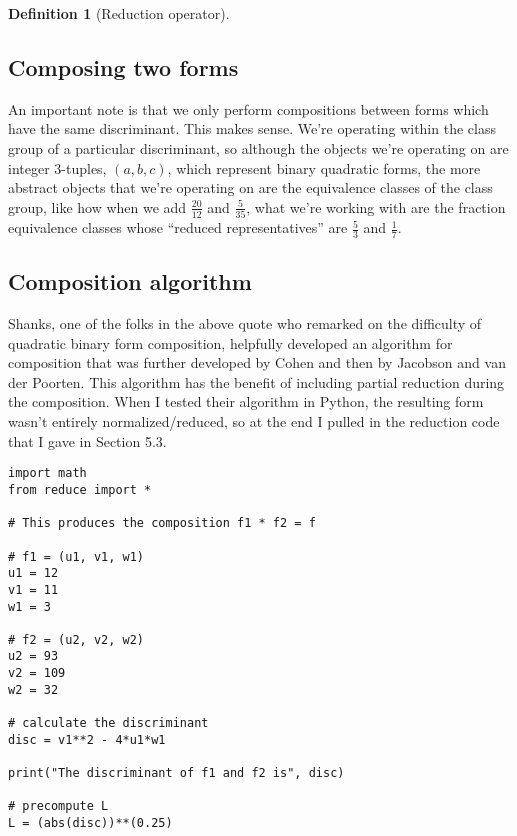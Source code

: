 \documentclass{article}
\theoremstyle{definition}
\newtheorem{definition}{Definition}[section]
\theoremstyle{theorem}
\theoremstyle{example}
\theoremstyle{corollary}
\begin{document}
\begin{definition}[Reduction operator]
\bigskip

\subsection{Composing two forms}

\bigskip

An important note is that we only perform compositions between forms which have the same discriminant. This makes sense. We're operating within the class group of a particular discriminant, so although the objects we're operating on are integer 3-tuples, \((a, b, c)\), which represent binary quadratic forms, the more abstract objects that we're operating on are the equivalence classes of the class group, like how when we add \(\frac{20}{12}\) and \(\frac{5}{35}\), what we're working with are the fraction equivalence classes whose ``reduced representatives'' are \(\frac{5}{3}\) and \(\frac{1}{7}\).

\bigskip

\subsection{Composition algorithm}

\bigskip

Shanks, one of the folks in the above quote who remarked on the difficulty of quadratic binary form composition, helpfully developed an algorithm for composition that was further developed by Cohen and then by Jacobson and van der Poorten. This algorithm has the benefit of including partial reduction during the composition. When I tested their algorithm in Python, the resulting form wasn't entirely normalized/reduced, so at the end I pulled in the reduction code that I gave in Section 5.3.

\bigskip

\hline

\bigskip

\begin{verbatim}
import math
from reduce import *

# This produces the composition f1 * f2 = f

# f1 = (u1, v1, w1)
u1 = 12
v1 = 11
w1 = 3

# f2 = (u2, v2, w2)
u2 = 93
v2 = 109
w2 = 32

# calculate the discriminant
disc = v1**2 - 4*u1*w1

print("The discriminant of f1 and f2 is", disc)

# precompute L
L = (abs(disc))**(0.25)


\end{verbatim}
\end{definition}
\end{document}
